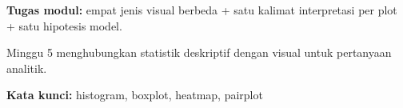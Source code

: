 \documentclass[../main.tex]{subfiles}
\begin{document}
\begin{asesmen}
\textbf{Tugas modul:} empat jenis visual berbeda + satu kalimat interpretasi per plot + satu hipotesis model.
\end{asesmen}

\begin{rangkuman}
Minggu 5 menghubungkan statistik deskriptif dengan visual untuk pertanyaan analitik.

\textbf{Kata kunci:} histogram, boxplot, heatmap, pairplot
\end{rangkuman}
\end{document}
